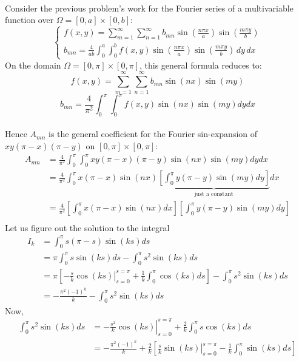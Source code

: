 \documentclass[12pt]{article}
\begin{document}
{\begin{align*}
\end{align*}
Consider the previous problem's work for the Fourier series of a multivariable function over $\Omega = [0,a] \times [0, b]$:
\[
\begin{cases}
\displaystyle f(x,y) =
\sum_{m=1}^\infty \sum_{n=1}^\infty
b_{mn} \sin\left(\frac{n\pi x}{a}\right)
\sin\left(\frac{m\pi y}{b}\right)
\\[20pt]
\displaystyle b_{mn} =
\frac{4}{ab}\int_0^a \int_0^b
f(x,y)\sin\left(\frac{n\pi x}{a}\right)
\sin\left(\frac{m\pi y}{b}\right)\,dy\,dx
\end{cases}
\]
On the domain $\Omega = [0, \pi] \times [0, \pi]$, this general formula reduces to:
$$f(x,y) = \sum_{m=1}^\infty \sum_{n=1}^\infty b_{mn} \sin \left ( nx \right )\sin \left ( my \right )$$
$$b_{mn} = \frac{4}{\pi^2} \int_0^{\pi}  \int_0^{\pi} f(x, y) \sin \left(nx \right) \sin \left( my \right) dy dx$$ \\
Hence $A_{mn}$ is the general coefficient for the Fourier sin-expansion of $ xy(\pi-x)(\pi-y)$ on $[0, \pi] \times [0, \pi]$:
\begin{align*}
A_{mn} &= \frac{4}{\pi^2} \int_0^{\pi}  \int_0^{\pi} xy(\pi-x)(\pi-y)\sin \left(nx \right) \sin \left( my \right) dy dx \\
&=  \frac{4}{\pi^2} \int_0^{\pi} x(\pi - x) \sin(nx) \underbrace{ \left[  \int_0^{\pi} y(\pi-y) \sin \left( my \right) dy \right] }_{\text{just a constant}}  dx \\
&=  \frac{4}{\pi^2} \left[  \int_0^{\pi} x(\pi - x) \sin(nx) dx \right]  \left[  \int_0^{\pi} y(\pi-y) \sin \left( my \right) dy \right] \\
\end{align*}
Let us figure out the solution to the integral
\begin{align*}
I_{k} &= \int_0^{\pi} s (\pi - s) \sin(k s) ds \\
&= \pi \int_0^{\pi} s \sin(k s) ds - \int_0^{\pi} s^2 \sin(k s) ds \\
&= \pi \left[ \left.  -\frac{s}{k} \cos(k s) \right|_{s=0}^{s=\pi}  + \frac{1}{k} \int_0^{\pi} \cos(k s) ds \right] - \int_0^{\pi} s^2 \sin(k s) ds \\
&= -\frac{ \pi^2 (-1)^k}{k} - \int_0^{\pi} s^2 \sin(k s) ds
\end{align*}
Now,
\begin{align*}
\int_0^{\pi} s^2 \sin(k s) ds &= \left. -\frac{s^2}{k} \cos(ks) \right|_{s=0}^{s=\pi} + \frac{2}{k} \int_{0}^{\pi} s \cos(ks) ds \\
&= -\frac{\pi^2 (-1)^k}{k} + \frac{2}{k} \left[ \left. \frac{s}{k} \sin(ks) \right|_{s=0}^{s=\pi} - \frac{1}{k} \int_0^{\pi} \sin(ks) ds  \right] \\

\end{align*}}
\end{document}
